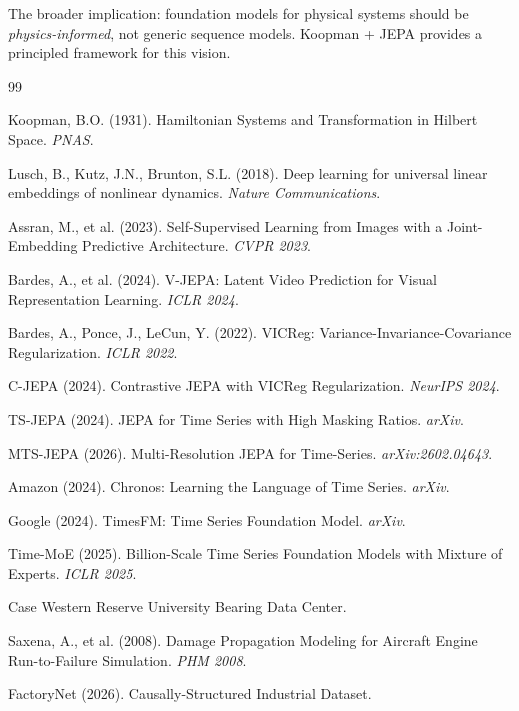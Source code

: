 \documentclass{article}
\begin{document}
The broader implication: foundation models for physical systems should be \emph{physics-informed}, not generic sequence models. Koopman + JEPA provides a principled framework for this vision.


\begin{thebibliography}{99}

Koopman, B.O. (1931). Hamiltonian Systems and Transformation in Hilbert Space. \textit{PNAS}.

Lusch, B., Kutz, J.N., Brunton, S.L. (2018). Deep learning for universal linear embeddings of nonlinear dynamics. \textit{Nature Communications}.

Assran, M., et al. (2023). Self-Supervised Learning from Images with a Joint-Embedding Predictive Architecture. \textit{CVPR 2023}.

Bardes, A., et al. (2024). V-JEPA: Latent Video Prediction for Visual Representation Learning. \textit{ICLR 2024}.

Bardes, A., Ponce, J., LeCun, Y. (2022). VICReg: Variance-Invariance-Covariance Regularization. \textit{ICLR 2022}.

C-JEPA (2024). Contrastive JEPA with VICReg Regularization. \textit{NeurIPS 2024}.

TS-JEPA (2024). JEPA for Time Series with High Masking Ratios. \textit{arXiv}.

MTS-JEPA (2026). Multi-Resolution JEPA for Time-Series. \textit{arXiv:2602.04643}.

Amazon (2024). Chronos: Learning the Language of Time Series. \textit{arXiv}.

Google (2024). TimesFM: Time Series Foundation Model. \textit{arXiv}.

Time-MoE (2025). Billion-Scale Time Series Foundation Models with Mixture of Experts. \textit{ICLR 2025}.

Case Western Reserve University Bearing Data Center.

Saxena, A., et al. (2008). Damage Propagation Modeling for Aircraft Engine Run-to-Failure Simulation. \textit{PHM 2008}.

FactoryNet (2026). Causally-Structured Industrial Dataset.

\end{thebibliography}
\end{document}

